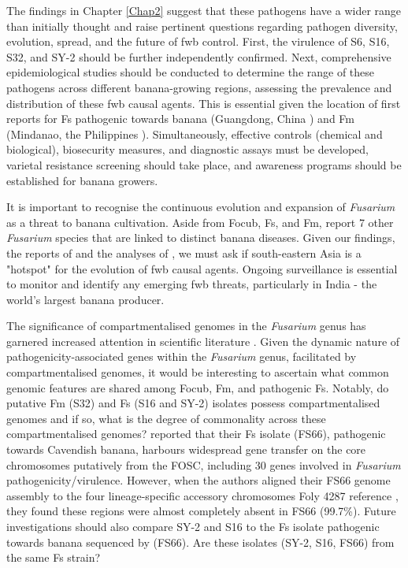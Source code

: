 The findings in Chapter \ref{Chap2} suggest that these pathogens have a wider range than initially thought and raise pertinent questions regarding pathogen diversity, evolution, spread, and the future of \ac{fwb} control. First, the virulence of S6, S16, S32, and SY-2 should be further independently confirmed. Next, comprehensive epidemiological studies should be conducted to determine the range of these pathogens across different banana-growing regions, assessing the prevalence and distribution of these \ac{fwb} causal agents. This is essential given the location of first reports for \ac{Fs} pathogenic towards banana (Guangdong, China \parencite{Cui2021}) and \ac{Fm} (Mindanao, the Philippines \parencite{Nozawa2023}). Simultaneously, effective controls (chemical and biological), biosecurity measures, and diagnostic assays must be developed, varietal resistance screening should take place, and awareness programs should be established for banana growers. 

It is important to recognise the continuous evolution and expansion of \textit{Fusarium} as a threat to banana cultivation. Aside from \ac{Focub}, \ac{Fs}, and \ac{Fm}, \textcite{Jones1997, Du2017} report 7 other \textit{Fusarium} species that are linked to distinct banana diseases. Given our findings, the reports of \textcite{Cui2021, Nozawa2023} and the analyses of \textcite{Maryani2019}, we must ask if south-eastern Asia is a "hotspot" for the evolution of \ac{fwb} causal agents. Ongoing surveillance is essential to monitor and identify any emerging \ac{fwb} threats, particularly in India - the world's largest banana producer.

The significance of compartmentalised genomes in the \textit{Fusarium} genus has garnered increased attention in scientific literature \parencite{Ma2010, Ma2013, Sperschneider2015b, Frantzeskakis2019, Hoh2022, Kamble2024}. Given the dynamic nature of pathogenicity-associated genes within the \textit{Fusarium} genus, facilitated by compartmentalised genomes, it would be interesting to ascertain what common genomic features are shared among \ac{Focub}, \ac{Fm}, and pathogenic \ac{Fs}. Notably, do putative \ac{Fm} (S32) and \ac{Fs} (S16 and SY-2) isolates possess compartmentalised genomes and if so, what is the degree of commonality across these compartmentalised genomes? \textcite{Cui2021} reported that their \ac{Fs} isolate (FS66), pathogenic towards Cavendish banana, harbours widespread gene transfer on the core chromosomes putatively from the \acl{FOSC}, including 30 genes involved in \textit{Fusarium} pathogenicity/virulence. However, when the authors aligned their FS66 genome assembly to the four lineage-specific accessory chromosomes \ac{Foly} 4287 reference \parencite{Ma2010}, they found these regions were almost completely absent in FS66 (99.7\%). Future investigations should also compare SY-2 and S16 to the \ac{Fs} isolate pathogenic towards banana sequenced by \textcite{Cui2021} (FS66). Are these isolates (SY-2, S16, FS66) from the same \ac{Fs} strain?

